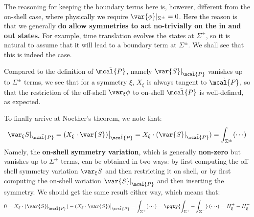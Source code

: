\documentclass[a4paper
	,10pt
]{article}
\begin{document}
	The reasoning for keeping the boundary terms here is, however, different from the on-shell case, where physically we require $\var{\phi}|_{\Sigma^\pm} = 0$. Here the reason is that we generally \textbf{do allow symmetries to act no-trivially on the in and out states.} For example, time translation evolves the states at $\Sigma^\pm$, so it is natural to assume that it will lead to a boundary term at $\Sigma^\pm$. We shall see that this is indeed the case.
	
	Compared to the definition of $\tilde{\mcal{P}}$, namely $\var{S}|_{\tilde{\mcal{P}}}$ vanishes up to $\Sigma^\pm$ terms, we see that for a symmetry $\xi$, $X_\xi$ is always tangent to $\tilde{\mcal{P}}$, so that the restriction of the off-shell $\var_\xi \phi$ to on-shell $\tilde{\mcal{P}}$ is well-defined, as expected. 
	
	To finally arrive at Noether's theorem, we note that:
	\begin{equation}
		\var_\xi S|_{\tilde{\mcal{P}}}
		= (X_\xi \cdot \var{S})\big|_{\tilde{\mcal{P}}}
		= X_\xi \cdot (\var{S}|_{\tilde{\mcal{P}}})
		= \int_{\Sigma^\pm} ({\cdots})
	\end{equation}
	Namely, the \textbf{on-shell symmetry variation}, which is generally \textbf{non-zero} but vanishes up to $\Sigma^\pm$ terms, can be obtained in two ways: by first computing the off-shell symmetry variation $\var_\xi S$ and then restricting it on shell, or by first computing the on-shell variation $\var{S}|_{\tilde{\mcal{P}}}$ and then inserting the symmetry. We should get the same result either way, which means that:
	\begin{equation}
		0 = X_\xi \cdot (\var{S}|_{\tilde{\mcal{P}}})
		- (X_\xi \cdot \var{S})\big|_{\tilde{\mcal{P}}}
		= \int_{\Sigma^\pm} ({\cdots})
		= \pqty{
				\int_{\Sigma^+} - \int_{\Sigma^-}
			}\, ({\cdots})
		= H_\xi^+ - H_\xi^-
	\label{eq:charge_conserve_schematic}
	\end{equation}
	
\end{document}
